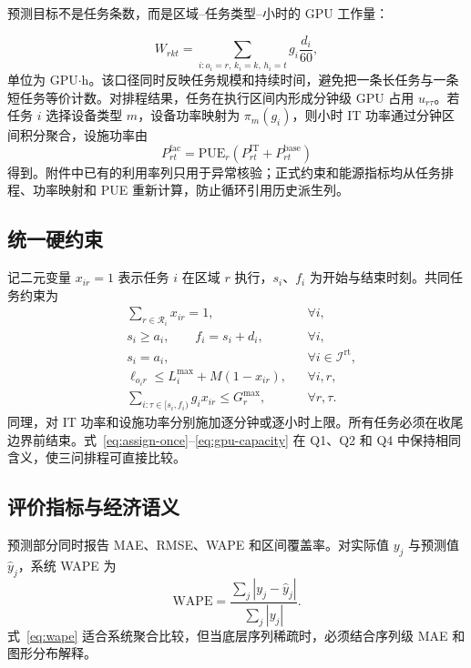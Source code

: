 预测目标不是任务条数，而是区域--任务类型--小时的 GPU 工作量：

\begin{equation}
  W_{rkt}=\sum_{i:o_i=r,\,k_i=k,\,h_i=t}g_i\frac{d_i}{60},
  \label{eq:workload}
\end{equation}
单位为 GPU$\cdot$h。该口径同时反映任务规模和持续时间，避免把一条长任务与一条短任务等价计数。对排程结果，任务在执行区间内形成分钟级 GPU 占用 $u_{r\tau}$。若任务 $i$ 选择设备类型 $m$，设备功率映射为 $\pi_m(g_i)$，则小时 IT 功率通过分钟区间积分聚合，设施功率由
\begin{equation}
  P^{\mathrm{fac}}_{rt}=\mathrm{PUE}_r\left(P^{\mathrm{IT}}_{rt}+P^{\mathrm{base}}_{rt}\right)
  \label{eq:facility-power}
\end{equation}
得到。附件中已有的利用率列只用于异常核验；正式约束和能源指标均从任务排程、功率映射和 PUE 重新计算，防止循环引用历史派生列。

\subsection{统一硬约束}

记二元变量 $x_{ir}=1$ 表示任务 $i$ 在区域 $r$ 执行，$s_i$、$f_i$ 为开始与结束时刻。共同任务约束为
\begin{align}
  &\sum_{r\in\mathcal R_i}x_{ir}=1, &&\forall i, \label{eq:assign-once}\\
  &s_i\ge a_i,\qquad f_i=s_i+d_i, &&\forall i, \label{eq:release}\\
  &s_i=a_i, &&\forall i\in\mathcal I^{\mathrm{rt}}, \label{eq:realtime}\\
  &\ell_{o_i r}\le L_i^{\max}+M(1-x_{ir}), &&\forall i,r, \label{eq:latency}\\
  &\sum_{i:\tau\in[s_i,f_i)}g_i x_{ir}\le G_r^{\max}, &&\forall r,\tau. \label{eq:gpu-capacity}
\end{align}
同理，对 IT 功率和设施功率分别施加逐分钟或逐小时上限。所有任务必须在收尾边界前结束。式~\eqref{eq:assign-once}--\eqref{eq:gpu-capacity} 在 Q1、Q2 和 Q4 中保持相同含义，使三问排程可直接比较。

\subsection{评价指标与经济语义}

预测部分同时报告 MAE、RMSE、WAPE 和区间覆盖率。对实际值 $y_j$ 与预测值 $\hat y_j$，系统 WAPE 为
\begin{equation}
  \mathrm{WAPE}=\frac{\sum_j|y_j-\hat y_j|}{\sum_j|y_j|}.
  \label{eq:wape}
\end{equation}
式~\eqref{eq:wape} 适合系统聚合比较，但当底层序列稀疏时，必须结合序列级 MAE 和图形分布解释。

